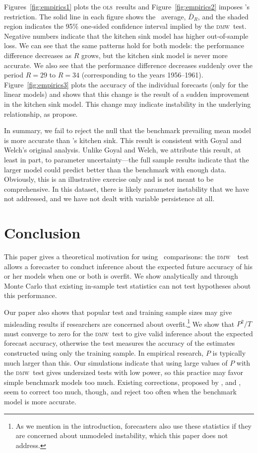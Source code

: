 \documentclass[11pt]{article}
\newcommand{\citepos}[1]{\citeauthor{#1}'s \citeyearpar{#1}}
\newcommand{\oosA}{\bar{D}_{R}}
\newcommand{\dmw}{\textsc{dmw}}
\newcommand{\ols}{\textsc{ols}}
\begin{document}
Figures~\ref{fig:empirics1} plots the \ols\ results and
Figure~\ref{fig:empirics2} imposes \citepos{CaT:08} restriction.  The
solid line in each figure shows the \oos\ average, $\oosA$, and the
shaded region indicates the 95\% one-sided confidence interval implied
by the \dmw\ test.  Negative numbers indicate that the kitchen sink
model has higher out-of-sample loss.  We can see that the same
patterns hold for both models: the performance difference decreases as
$R$ grows, but the kitchen sink model is never more accurate.  We also
see that the performance difference decreases suddenly over the period
$R=29$ to $R=34$ (corresponding to the years 1956--1961).
Figure~\ref{fig:empirics3} plots the accuracy of the individual
forecasts (only for the linear models) and shows that this change is
the result of a sudden improvement in the kitchen sink model.  This
change may indicate instability in the underlying relationship, as
\citet{GoW:08} propose.

In summary, we fail to reject the null that the benchmark prevailing
mean model is more accurate than \citepos{GoW:08} kitchen sink.  This
result is consistent with Goyal and Welch's original analysis.  Unlike
Goyal and Welch, we attribute this result, at least in part, to
parameter uncertainty---the full sample results indicate that the
larger model could predict better than the benchmark with enough data.
Obviously, this is an illustrative exercise only and is not meant to
be comprehensive.  In this dataset, there is likely parameter
instability that we have not addressed, and we have not dealt with
variable persistence at all.
\section{Conclusion}\label{sec:conclusion}
This paper gives a theoretical motivation for using \oos\ comparisons:
the \dmw\ \oos\ test allows a forecaster to conduct inference about
the expected future accuracy of his or her models when one or both is
overfit.  We show analytically and through Monte Carlo that existing
in-sample test statistics can not test hypotheses about this
performance.

Our paper also shows that popular test and training sample sizes may
give misleading results if researchers are concerned about
overfit.\footnote{As we mention in the introduction, forecasters also
  use these statistics if they are concerned about unmodeled
  instability, which this paper does not address.}  We show that
$P^2/T$ must converge to zero for the \dmw\ test to give valid
inference about the expected forecast accuracy, otherwise the test
measures the accuracy of the estimates constructed using only the
training sample.  In empirical research, $P$ is typically much larger
than this.  Our simulations indicate that using large values of $P$
with the \dmw\ test gives undersized tests with low power, so this
practice may favor simple benchmark models too much.  Existing
corrections, proposed by \citet{ClM:01,ClM:05}, \citet{Mcc:07} and
\citet{ClW:06,ClW:07}, seem to correct too much, though, and reject
too often when the benchmark model is more accurate.
\end{document}

